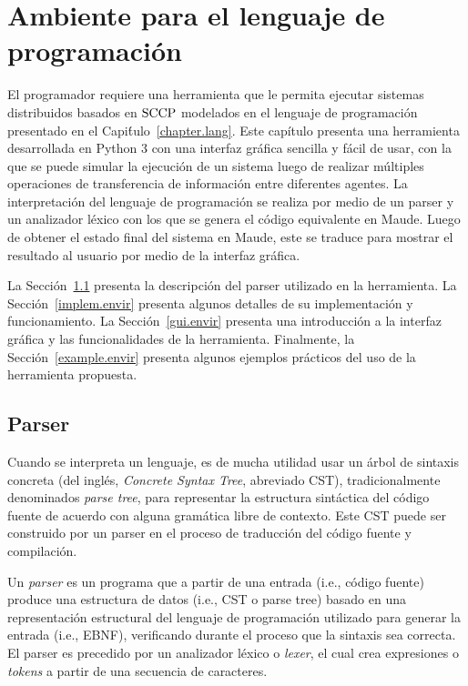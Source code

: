 
\chapter{Ambiente para el lenguaje de programaci\'on}
\label{chapter.envir}

El programador requiere una herramienta que le permita ejecutar sistemas distribuidos basados en $\textnormal{SCCP}$ modelados en el lenguaje de programaci\'on presentado en el Capi\'tulo~\ref{chapter.lang}. Este cap\'itulo presenta una herramienta desarrollada en Python 3 con una interfaz gr\'afica sencilla y f\'acil de usar, con la que se puede simular la ejecuci\'on de un sistema luego de realizar m\'ultiples operaciones de transferencia de informaci\'on entre diferentes agentes. La interpretaci\'on del lenguaje de programaci\'on se realiza por medio de un parser y un analizador l\'exico con los que se genera el c\'odigo equivalente en Maude. Luego de obtener el estado final del sistema en Maude, este se traduce para mostrar el resultado al usuario por medio de la interfaz gr\'afica.

La Secci\'on~\ref{parser.envir} presenta la descripci\'on del parser utilizado en la herramienta. La Secci\'on~\ref{implem.envir} presenta algunos detalles de su implementaci\'on y funcionamiento. La Secci\'on~\ref{gui.envir} presenta una introducci\'on a la interfaz gr\'afica y las funcionalidades de la herramienta. Finalmente, la Secci\'on~\ref{example.envir} presenta algunos ejemplos  pr\'acticos del uso de la herramienta propuesta.

\section{Parser}
\label{parser.envir}

Cuando se interpreta un lenguaje, es de mucha utilidad usar un \'arbol de sintaxis concreta (del ingl\'es, \textit{Concrete Syntax Tree}, abreviado CST), tradicionalmente denominados \textit{parse tree}, para representar la estructura sint\'actica del c\'odigo fuente de acuerdo con alguna gram\'atica libre de contexto. Este CST puede ser construido por un parser en el proceso de traducci\'on del c\'odigo fuente y compilaci\'on. 

Un \textit{parser} es un programa que a partir de una entrada (i.e., c\'odigo fuente) produce una estructura de datos (i.e., CST o parse tree) basado en una representaci\'on estructural del lenguaje de programaci\'on utilizado para generar la entrada (i.e., EBNF), verificando durante el proceso que la sintaxis sea correcta. El parser es precedido por un analizador l\'exico o \textit{lexer}, el cual crea expresiones o \textit{tokens} a partir de una secuencia de caracteres. 

